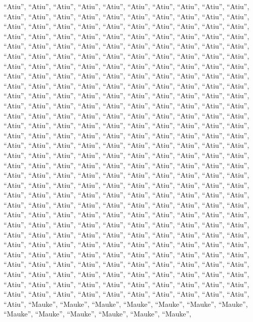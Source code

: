 \documentclass[
  ,man]{apa6}
\begin{document}
``Atiu'', ``Atiu'', ``Atiu'', ``Atiu'', ``Atiu'', ``Atiu'', ``Atiu'', ``Atiu'', ``Atiu'', ``Atiu'', ``Atiu'', ``Atiu'', ``Atiu'', ``Atiu'', ``Atiu'', ``Atiu'', ``Atiu'', ``Atiu'', ``Atiu'', ``Atiu'', ``Atiu'', ``Atiu'', ``Atiu'', ``Atiu'', ``Atiu'', ``Atiu'', ``Atiu'', ``Atiu'', ``Atiu'', ``Atiu'', ``Atiu'', ``Atiu'', ``Atiu'', ``Atiu'', ``Atiu'', ``Atiu'', ``Atiu'', ``Atiu'', ``Atiu'', ``Atiu'', ``Atiu'', ``Atiu'', ``Atiu'', ``Atiu'', ``Atiu'', ``Atiu'', ``Atiu'', ``Atiu'', ``Atiu'', ``Atiu'', ``Atiu'', ``Atiu'', ``Atiu'', ``Atiu'', ``Atiu'', ``Atiu'', ``Atiu'', ``Atiu'', ``Atiu'', ``Atiu'', ``Atiu'', ``Atiu'', ``Atiu'',
``Atiu'', ``Atiu'', ``Atiu'', ``Atiu'', ``Atiu'', ``Atiu'', ``Atiu'', ``Atiu'', ``Atiu'', ``Atiu'', ``Atiu'', ``Atiu'', ``Atiu'', ``Atiu'', ``Atiu'', ``Atiu'', ``Atiu'', ``Atiu'', ``Atiu'', ``Atiu'', ``Atiu'', ``Atiu'', ``Atiu'', ``Atiu'', ``Atiu'', ``Atiu'', ``Atiu'', ``Atiu'', ``Atiu'', ``Atiu'', ``Atiu'', ``Atiu'', ``Atiu'', ``Atiu'', ``Atiu'', ``Atiu'', ``Atiu'', ``Atiu'', ``Atiu'', ``Atiu'', ``Atiu'', ``Atiu'', ``Atiu'', ``Atiu'', ``Atiu'', ``Atiu'', ``Atiu'', ``Atiu'', ``Atiu'', ``Atiu'', ``Atiu'', ``Atiu'', ``Atiu'', ``Atiu'', ``Atiu'', ``Atiu'', ``Atiu'', ``Atiu'', ``Atiu'', ``Atiu'', ``Atiu'', ``Atiu'', ``Atiu'',
``Atiu'', ``Atiu'', ``Atiu'', ``Atiu'', ``Atiu'', ``Atiu'', ``Atiu'', ``Atiu'', ``Atiu'', ``Atiu'', ``Atiu'', ``Atiu'', ``Atiu'', ``Atiu'', ``Atiu'', ``Atiu'', ``Atiu'', ``Atiu'', ``Atiu'', ``Atiu'', ``Atiu'', ``Atiu'', ``Atiu'', ``Atiu'', ``Atiu'', ``Atiu'', ``Atiu'', ``Atiu'', ``Atiu'', ``Atiu'', ``Atiu'', ``Atiu'', ``Atiu'', ``Atiu'', ``Atiu'', ``Atiu'', ``Atiu'', ``Atiu'', ``Atiu'', ``Atiu'', ``Atiu'', ``Atiu'', ``Atiu'', ``Atiu'', ``Atiu'', ``Atiu'', ``Atiu'', ``Atiu'', ``Atiu'', ``Atiu'', ``Atiu'', ``Atiu'', ``Atiu'', ``Atiu'', ``Atiu'', ``Atiu'', ``Atiu'', ``Atiu'', ``Atiu'', ``Atiu'', ``Atiu'', ``Atiu'', ``Atiu'',
``Atiu'', ``Atiu'', ``Atiu'', ``Atiu'', ``Atiu'', ``Atiu'', ``Atiu'', ``Atiu'', ``Atiu'', ``Atiu'', ``Atiu'', ``Atiu'', ``Atiu'', ``Atiu'', ``Atiu'', ``Atiu'', ``Atiu'', ``Atiu'', ``Atiu'', ``Atiu'', ``Atiu'', ``Atiu'', ``Atiu'', ``Atiu'', ``Atiu'', ``Atiu'', ``Atiu'', ``Atiu'', ``Atiu'', ``Atiu'', ``Atiu'', ``Atiu'', ``Atiu'', ``Atiu'', ``Atiu'', ``Atiu'', ``Atiu'', ``Atiu'', ``Atiu'', ``Atiu'', ``Atiu'', ``Atiu'', ``Atiu'', ``Atiu'', ``Atiu'', ``Atiu'', ``Atiu'', ``Atiu'', ``Atiu'', ``Atiu'', ``Atiu'', ``Atiu'', ``Atiu'', ``Atiu'', ``Atiu'', ``Atiu'', ``Atiu'', ``Atiu'', ``Atiu'', ``Atiu'', ``Atiu'', ``Atiu'', ``Atiu'',
``Atiu'', ``Atiu'', ``Atiu'', ``Atiu'', ``Atiu'', ``Atiu'', ``Atiu'', ``Atiu'', ``Atiu'', ``Atiu'', ``Atiu'', ``Atiu'', ``Atiu'', ``Atiu'', ``Atiu'', ``Atiu'', ``Atiu'', ``Atiu'', ``Atiu'', ``Atiu'', ``Atiu'', ``Atiu'', ``Atiu'', ``Atiu'', ``Atiu'', ``Atiu'', ``Atiu'', ``Atiu'', ``Atiu'', ``Atiu'', ``Atiu'', ``Atiu'', ``Atiu'', ``Atiu'', ``Atiu'', ``Atiu'', ``Atiu'', ``Atiu'', ``Atiu'', ``Atiu'', ``Atiu'', ``Atiu'', ``Atiu'', ``Atiu'', ``Atiu'', ``Atiu'', ``Atiu'', ``Atiu'', ``Atiu'', ``Mauke'', ``Mauke'', ``Mauke'', ``Mauke'', ``Mauke'', ``Mauke'', ``Mauke'', ``Mauke'', ``Mauke'', ``Mauke'', ``Mauke'', ``Mauke'', ``Mauke'',
\end{document}
